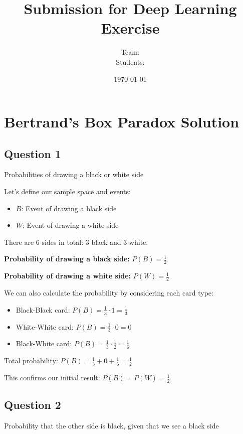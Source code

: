 \documentclass[addpoints]{exam}
\title{Submission for Deep Learning Exercise \assignmentnumber}
\author{Team: \teamname\\Students: \students}
\date{\today}
\begin{document}
\maketitle

\section{Bertrand's Box Paradox Solution}

\subsection{Question 1}
Probabilities of drawing a black or white side

Let's define our sample space and events:

\begin{itemize}
    \item $B$: Event of drawing a black side
    \item $W$: Event of drawing a white side
\end{itemize}

There are 6 sides in total: 3 black and 3 white.

\textbf{Probability of drawing a black side:} $P(B) = \boxed{\frac{1}{2}}$ 

\textbf{Probability of drawing a white side:} $P(W) = \boxed{\frac{1}{2}}$


We can also calculate the probability by considering each card type:

\begin{itemize}
    \item Black-Black card: $P(B) = \frac{1}{3} \cdot 1 = \frac{1}{3}$
    \item White-White card: $P(B) = \frac{1}{3} \cdot 0 = 0$
    \item Black-White card: $P(B) = \frac{1}{3} \cdot \frac{1}{2} = \frac{1}{6}$
\end{itemize}

Total probability: $P(B) = \frac{1}{3} + 0 + \frac{1}{6} = \frac{1}{2}$

This confirms our initial result: $P(B) = P(W) = \frac{1}{2}$

\subsection{Question 2}
Probability that the other side is black, given that we see a black side
\end{document}
